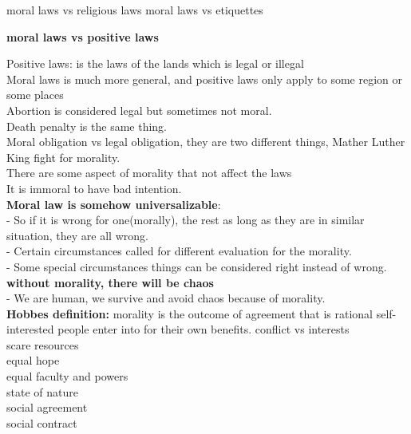 moral laws vs religious laws
moral laws vs etiquettes

\textbf{moral laws vs positive laws}

Positive laws: is the laws of the lands which is legal or illegal\\
Moral laws is much more general, and positive laws only apply to some region or some places\\
Abortion is considered legal but sometimes not moral.\\
Death penalty is the same thing.\\
Moral obligation vs legal obligation, they are two different things, Mather Luther King fight for morality.\\
There are some aspect of morality that not affect the laws\\
It is immoral to have bad intention.\\

\textbf{ Moral law is somehow universalizable}:\\
- So if it is wrong for one(morally), the rest as long as they are in similar situation, they are all wrong.\\
- Certain circumstances called for different evaluation for the morality.\\
- Some special circumstances things can be considered right instead of wrong.\\

\textbf{without morality, there will be chaos}\\
- We are human, we survive and avoid chaos because of morality.\\

\textbf{Hobbes definition: } morality  is the outcome of agreement that is rational self-interested people enter into for their own benefits.
conflict vs interests\\
scare resources\\
equal hope\\
equal faculty and powers\\
state of nature\\
social agreement\\
social contract\\